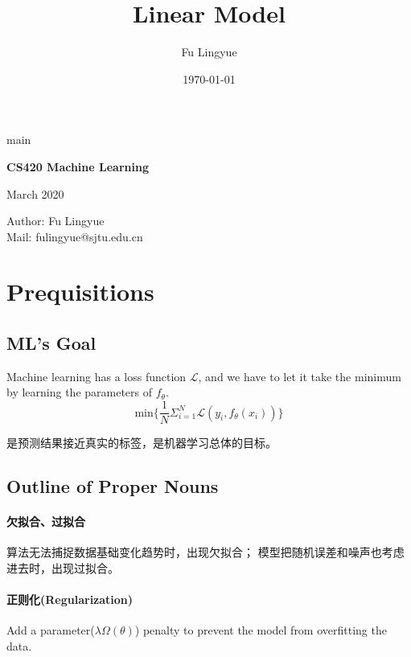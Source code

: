 \documentclass[12pt,a4paper]{article}
\title{Linear Model}
\author{Fu Lingyue}
\date{\today}
\theoremstyle{mythm}
\begin{document}
 
\newpagestyle
{main}{               
    \headrule                %
    \footrule    %
}

\pagestyle{main}    %


\begin{center}
    \Huge
    \textbf{CS420 Machine Learning}
     
\end{center}

\begin{center}
    \par March 2020
    \par Author: Fu Lingyue  \\Mail: fulingyue@sjtu.edu.cn
\end{center}

\tableofcontents
\newpage


\section{Prequisitions}
\subsection{ML's Goal}
Machine learning has a loss function $\mathcal{L}$, 
and we have to let it take the minimum by learning the parameters of $f_\theta$.
$$ 
\mathrm{min} \{\frac{1}{N} \Sigma_{i = 1}^N \mathcal{L} (y_i,f_\theta(x_i))\}
$$

是预测结果接近真实的标签，是机器学习总体的目标。

\subsection{Outline of Proper Nouns}
\paragraph{欠拟合、过拟合}
算法无法捕捉数据基础变化趋势时，出现欠拟合；
模型把随机误差和噪声也考虑进去时，出现过拟合。

\paragraph{正则化(Regularization)} Add a parameter($\lambda \Omega(\theta)$) penalty to prevent the model from overfitting the data.
\end{document}
